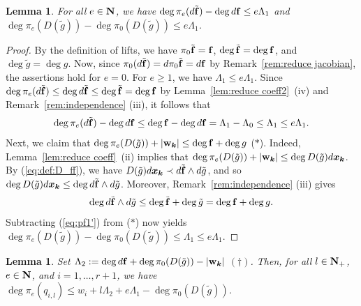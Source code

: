 \documentclass{amsart}
\theoremstyle{plain}
\newtheorem{lem}[thm]{Lemma}
\theoremstyle{definition}
\newcommand{\N}{{\bf N}}
\newcommand{\x}{{\boldsymbol x}}
\newcommand{\w}{{\bf w}}
\newcommand{\bk}{{\boldsymbol k}}
\newcommand{\ff}{{\bf f}}
\newcommand{\degw  }{\deg}
\begin{document}
\begin{lem}\label{lem:gap}
For all $e\in \N $, we have 
$\degw \pi_e(d\tilde{\ff })-\degw d\ff \le e\Lambda _1$ 
and 
$\degw \pi_e(D(\tilde{g}))-\degw \pi _0(D(\tilde{g}))\le e\Lambda _1$. 
\end{lem}
\begin{proof}
By the definition of lifts, 
we have 
$\pi _0\tilde{\ff }=\ff $, 
$\deg \tilde{\ff }=\deg \ff $, 
and $\deg \tilde{g}=\deg g$. 
Now, 
since $\pi _0(d\tilde{\ff })=d\pi _0\tilde{\ff }=d\ff $ 
by Remark~\ref{rem:reduce jacobian}, 
the assertions hold for $e=0$. 
For $e\ge 1$, 
we have $\Lambda _1\le e\Lambda _1$. 
Since 
$\deg \pi _e(d\tilde{\ff })\le 
\deg d\tilde{\ff }\le 
\deg \tilde{\ff }=\deg \ff $ 
by Lemma~\ref{lem:reduce coeff2}~(iv) and 
Remark~\ref{rem:independence} (iii), 
it follows that 
\begin{equation}\label{eq:gap1}
\deg \pi_e(d\tilde{\ff })-\deg d\ff \le \deg \ff -\deg d\ff 
=\Lambda _1-\Lambda _0\le \Lambda _1\le e\Lambda _1. 
\end{equation}
Next, 
we claim that 
$\degw \pi _e(D(\tilde{g}))+|\w _{\bk }|\le \deg \ff +\deg g$ ($*$). 
Indeed, 
Lemma~\ref{lem:reduce coeff}~(ii) implies that 
$\degw \pi _e(D(\tilde{g}))+|\w _{\bk }|\le \degw D(\tilde{g})d\x _{\bk }$. 
By (\ref{eq:def:D_ff}), 
we have $D(\tilde{g})d\x _{\bk }\prec d\tilde{\ff }\wedge d\tilde{g}$, 
and so 
$\degw D(\tilde{g})d\x _{\bk }\le \degw d\tilde{\ff }\wedge d\tilde{g}$. 
Moreover, 
Remark~\ref{rem:independence} (iii) gives 
\begin{equation}\label{eq:gap2}
\degw d\tilde{\ff }\wedge d\tilde{g}\le 
\deg \tilde{\ff }+\deg \tilde{g}=\deg \ff +\deg g. 
\end{equation}
Subtracting (\ref{eq:pf1'}) from ($*$) 
now yields 
$\degw \pi_e(D(\tilde{g}))-\degw \pi _0(D(\tilde{g}))
\le \Lambda _1\le e\Lambda _1$. 
\end{proof}



\begin{lem}\label{lem:estimation}
Set 
$\Lambda _2:=\degw d\ff +\degw \pi _0(D(\tilde{g}))-|\w _{\bk }|$ 
$(\dag )$. 
Then, for all $l\in \N _+$, $e\in \N $, and $i=1,\ldots ,r+1$, 
we have 
$\degw \pi _e(q_{i,l})
\le w_i+l\Lambda _2+e\Lambda _1-\degw \pi _0(D(\tilde{g}))$. 
\end{lem}
\end{document}
